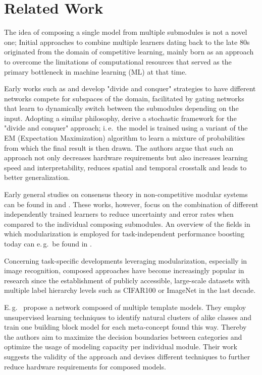 \documentclass[conference]{IEEEtran}
\begin{document}
\section{Related Work%
         \label{sec:related_work}}

The idea of composing a single model from multiple submodules is not a novel one; Initial approaches to combine multiple learners dating back to the late 80s originated from the domain of competitive learning, mainly born as an approach to overcome the limitations of computational resources that served as the primary bottleneck in machine learning (ML) at that time.

Early works such as \cite{Jacobs1991-fo} and \cite{Jacobs1991-rz} develop "divide and conquer" strategies to have different networks compete for subspaces of the domain, facilitated by gating networks that learn to dynamically switch between the submodules depending on the input. Adopting a similar philosophy, \cite{Jordan1994-gn} derive a stochastic framework for the "divide and conquer" approach; i.\,e.\ the model is trained using a variant of the EM (Expectation Maximization) algorithm to learn a mixture of probabilities from which the final result is then drawn. The authors argue that such an approach not only decreases hardware requirements but also increases learning speed and interpretability, reduces spatial and temporal crosstalk and leads to better generalization.

Early general studies on consensus theory in non-competitive modular systems can be found in \cite{Benediktsson1992-bl} and \cite{Xu1992-hp}. These works, however, focus on the combination of different independently trained learners to reduce uncertainty and error rates when compared to the individual composing submodules. An overview of the fields in which modularization is employed for task-independent performance boosting today can e.\,g.\ be found in \cite{Alpaydin2019-nh}.

Concerning task-specific developments leveraging modularization, especially in image recognition, composed approaches have become increasingly popular in research since the establishment of publicly accessible, large-scale datasets with multiple label hierarchy levels such as CIFAR100 or ImageNet in the last decade.

E.\,g.\ \cite{Yan2015-go} propose a network composed of multiple template models. They employ unsupervised learning techniques to identify natural clusters of alike classes and train one building block model for each meta-concept found this way. Thereby the authors aim to maximize the decision boundaries between categories and optimize the usage of modeling capacity per individual module. Their work suggests the validity of the approach and devises different techniques to further reduce hardware requirements for composed models.
\end{document}
